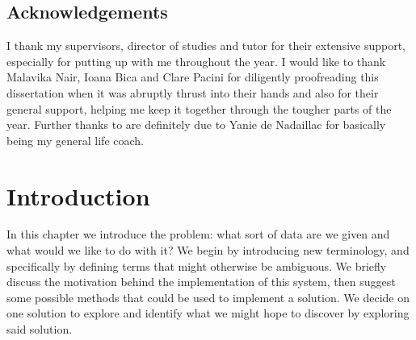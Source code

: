 \documentclass[12pt,twoside,notitlepage]{report}
\begin{document}

\listoffigures

\listoftables

\lstlistoflistings











\clearpage
\section*{Acknowledgements}

I thank my supervisors, director of studies and tutor for their extensive support, especially for putting up with me 
throughout the year. I would like to thank Malavika Nair, Ioana Bica and Clare Pacini for diligently proofreading 
this dissertation when it was abruptly thrust into their hands and also for their general support, helping me keep 
it together through the tougher parts of the year. Further thanks to are definitely due to Yanie de Nadaillac for 
basically being my general life coach.











\cleardoublepage        %

\setcounter{page}{1}
\pagestyle{headings}
















\cleardoublepage
\chapter{Introduction}
    In this chapter we introduce the problem: what sort of data are we given and what would we like to do with it? We 
    begin by introducing new terminology, and specifically by defining terms that might otherwise be ambiguous. We briefly 
    discuss the motivation behind the implementation of this system, then suggest some possible methods that 
    could be used to implement a solution. We decide on one solution to explore and identify what we might hope to discover 
    by exploring said solution.
\end{document}
